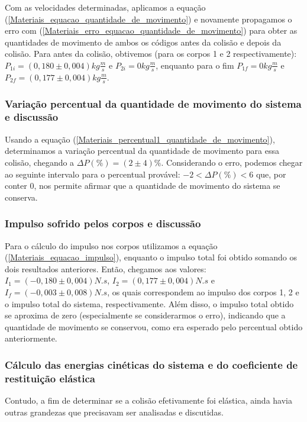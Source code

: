 \documentclass[12pt, twoside]{article}
\begin{document}
    Com as velocidades determinadas, aplicamos a equação (\ref{Materiais_equacao_quantidade_de_movimento}) e novamente propagamos o erro com (\ref{Materiais_erro_equacao_quantidade_de_movimento}) para obter as quantidades de movimento de ambos os códigos antes da colisão e depois da colisão. Para antes da colisão, obtivemos (para os corpos 1 e 2 respectivamente): $P_{1i} = (0,180 \pm 0,004)kg\frac{m}{s}$ e $P_{2i} = 0 kg\frac{m}{s}$, enquanto para o fim $P_{1f} = 0 kg\frac{m}{s}$ e $P_{2f} = (0,177 \pm 0,004) kg\frac{m}{s}$.

\subsubsection{Variação percentual da quantidade de movimento do sistema e discussão}

    Usando a equação (\ref{Materiais_percentual1_quantidade_de_movimento}), determinamos a variação percentual da quantidade de movimento para essa colisão, chegando a $\Delta P(\%) = (2 \pm 4)\%$. Considerando o erro, podemos chegar ao seguinte intervalo para o percentual provável: $-2 < \Delta P(\%) < 6$ que, por conter 0, nos permite afirmar que a quantidade de movimento do sistema se conserva.

\subsubsection{Impulso sofrido pelos corpos e discussão}

    Para o cálculo do impulso nos corpos utilizamos a equação (\ref{Materiais_equacao_impulso}), enquanto o impulso total foi obtido somando os dois resultados anteriores. Então, chegamos aos valores: $I_1 = (-0,180 \pm 0,004)N.s$,  $I_2 = (0,177 \pm 0,004)N.s$ e $I_f = (-0,003 \pm 0,008)N.s$, os quais correspondem ao impulso dos corpos 1, 2 e o impulso total do sistema, respectivamente. Além disso, o impulso total obtido se aproxima de zero (especialmente se considerarmos o erro), indicando que a quantidade de movimento se conservou, como era esperado pelo percentual obtido anteriormente.


\subsubsection{Cálculo das energias cinéticas do sistema e do coeficiente de restituição elástica}

    Contudo, a fim de determinar se a colisão efetivamente foi elástica, ainda havia outras grandezas que precisavam ser analisadas e discutidas. 
\end{document}
